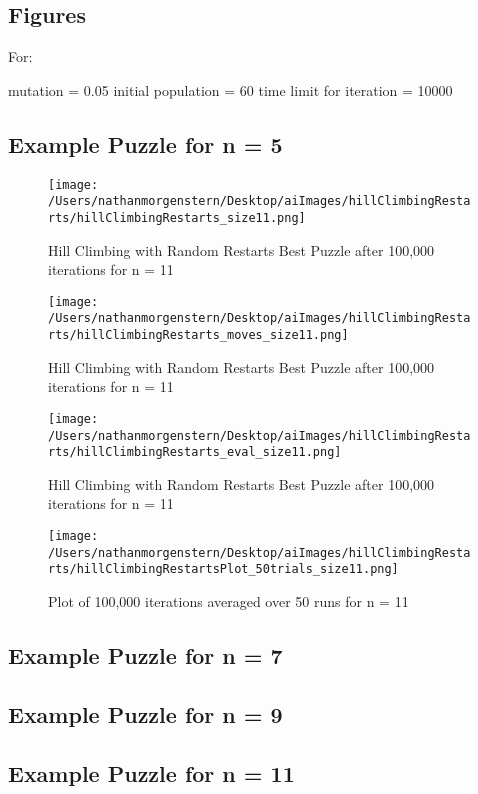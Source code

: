 \documentclass{report}
\begin{document}
\subsection{Figures}
For:

mutation = 0.05
initial population = 60
time limit for iteration = 10000



\subsection{Example Puzzle for n = 5}
	\begin{figure}[H]
	\centering
	\texttt{[image: /Users/nathanmorgenstern/Desktop/aiImages/hillClimbingRestarts/hillClimbingRestarts\_size11.png]}
	\caption{Hill Climbing with Random Restarts Best Puzzle after 100,000 iterations for n = 11} 
	\label{fig: Hill Climbing with Random Restarts Best Puzzle after 100,000 iterations for n = 11}
	\end{figure}
	
	\begin{figure}[H]
	\centering
	\texttt{[image: /Users/nathanmorgenstern/Desktop/aiImages/hillClimbingRestarts/hillClimbingRestarts\_moves\_size11.png]}
	\caption{Hill Climbing with Random Restarts Best Puzzle after 100,000 iterations for n = 11} 
	\label{fig: Hill Climbing with Random Restarts Best Puzzle after 100,000 iterations for n = 11}
	\end{figure}

	\begin{figure}[H]
	\centering
	\texttt{[image: /Users/nathanmorgenstern/Desktop/aiImages/hillClimbingRestarts/hillClimbingRestarts\_eval\_size11.png]}
	\caption{Hill Climbing with Random Restarts Best Puzzle after 100,000 iterations for n = 11} 
	\label{fig: Hill Climbing with Random Restarts Best Puzzle after 100,000 iterations for n = 11}
	\end{figure}

	\begin{figure}[H]
	\centering
	\texttt{[image: /Users/nathanmorgenstern/Desktop/aiImages/hillClimbingRestarts/hillClimbingRestartsPlot\_50trials\_size11.png]}
	\caption{Plot of 100,000 iterations averaged over 50 runs for n = 11}
	\label{fig: Plot of 100,000 iterations averaged over 50 runs for n = 11}
	\end{figure}

\subsection{Example Puzzle for n = 7}

\subsection{Example Puzzle for n = 9}

\subsection{Example Puzzle for n = 11}
\end{document}
